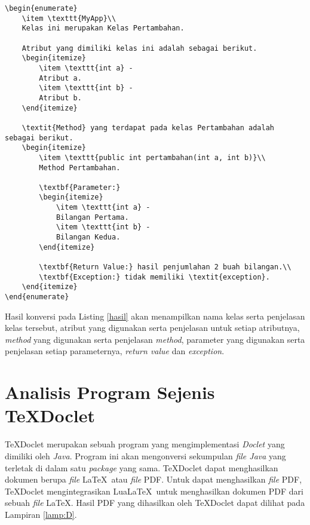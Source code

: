 \begin{lstlisting}[caption=Contoh hasil konversi ke \LaTeX, label={hasil}]
\begin{enumerate}
	\item \texttt{MyApp}\\
	Kelas ini merupakan Kelas Pertambahan.
	
	Atribut yang dimiliki kelas ini adalah sebagai berikut.
	\begin{itemize}
		\item \texttt{int a} -
		Atribut a.
		\item \texttt{int b} -
		Atribut b.
	\end{itemize}
	
	\textit{Method} yang terdapat pada kelas Pertambahan adalah sebagai berikut.
	\begin{itemize}
		\item \texttt{public int pertambahan(int a, int b)}\\
		Method Pertambahan.
		
		\textbf{Parameter:}
		\begin{itemize}
			\item \texttt{int a} - 
			Bilangan Pertama.
			\item \texttt{int b} - 
			Bilangan Kedua.
		\end{itemize}
		
		\textbf{Return Value:} hasil penjumlahan 2 buah bilangan.\\
		\textbf{Exception:} tidak memiliki \textit{exception}.
	\end{itemize}
\end{enumerate}
\end{lstlisting}

Hasil konversi pada Listing \ref{hasil} akan menampilkan nama kelas serta penjelasan kelas tersebut, atribut yang digunakan serta penjelasan untuk setiap atributnya, {\it method} yang digunakan serta penjelasan {\it method}, parameter yang digunakan serta penjelasan setiap parameternya, {\it return value} dan {\it exception}.

\section{Analisis Program Sejenis TeXDoclet}
\label{sec:texdoclet}
TeXDoclet merupakan sebuah program yang mengimplementasi {\it Doclet} yang dimiliki oleh {\it Java}. Program ini akan mengonversi sekumpulan {\it file Java} yang terletak di dalam satu {\it package} yang sama. TeXDoclet dapat menghasilkan dokumen berupa {\it file} \LaTeX\ atau {\it file} PDF. Untuk dapat menghasilkan {\it file} PDF, TeXDoclet mengintegrasikan Lua\LaTeX\ untuk menghasilkan dokumen PDF dari sebuah {\it file} \LaTeX. Hasil PDF yang dihasilkan oleh TeXDoclet dapat dilihat pada Lampiran \ref{lamp:D}.

